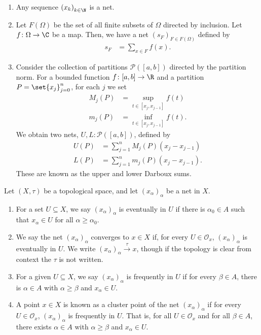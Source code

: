 \begin{example}
\begin{enumerate}[(1)]
  \item Any sequence $\left(x_k\right)_{k\in \N}$ is a net.
  \item Let $F\left(\Omega\right)$ be the set of all finite subsets of $\Omega$ directed by inclusion. Let $f\colon \Omega\rightarrow \C$ be a map. Then, we have a net $\left(s_F\right)_{F\in F\left(\Omega\right)}$ defined by
    \begin{align*}
      s_F &= \sum_{x\in F}f\left(x\right).
    \end{align*}
  \item Consider the collection of partitions $\mathcal{P}\left([a,b]\right)$ directed by the partition norm. For a bounded function $f\colon [a,b]\rightarrow \R$ and a partition $P = \set{x_j}_{j=0}^{n}$, for each $j$ we set
    \begin{align*}
      M_j\left(P\right) &= \sup_{t\in \left[x_j,x_{j-1}\right]}f(t)\\
      m_j\left(P\right) &= \inf_{t\in \left[x_j,x_{j-1}\right]}f(t).
    \end{align*}
    We obtain two nets, $U,L\colon \mathcal{P}\left([a,b]\right)$, defined by
    \begin{align*}
      U\left(P\right) &= \sum_{j=1}^{n}M_j\left(P\right)\left(x_j - x_{j-1}\right)\\
      L\left(P\right) &= \sum_{j=1}^{n}m_j\left(P\right)\left(x_j-x_{j-1}\right).
    \end{align*}
    These are known as the upper and lower Darboux sums.
\end{enumerate}
\end{example}
\begin{definition}
  Let $\left(X,\tau\right)$ be a topological space, and let $\left(x_{\alpha}\right)_{\alpha}$ be a net in $X$.
  \begin{enumerate}[(1)]
    \item For a set $U\subseteq X$, we say $\left(x_{\alpha}\right)_{\alpha}$ is eventually in $U$ if there is $\alpha_0\in A$ such that $x_{\alpha}\in U$ for all $\alpha \geq \alpha_0$.
    \item We say the net $\left(x_{\alpha}\right)_{\alpha}$ converges to $x\in X$ if, for every $U\in \mathcal{O}_{x}$, $\left(x_{\alpha}\right)_{\alpha}$ is eventually in $U$. We write $\left(x_{\alpha}\right)_{\alpha}\xrightarrow{\tau}x$, though if the topology is clear from context the $\tau$ is not written.
    \item For a given $U\subseteq X$, we say $\left(x_{\alpha}\right)_{\alpha}$ is frequently in $U$ if for every $\beta \in A$, there is $\alpha \in A$ with $\alpha \geq \beta$ and $x_{\alpha}\in U$.
    \item A point $x\in X$ is known as a cluster point of the net $\left(x_{\alpha}\right)_{\alpha}$ if for every $U\in \mathcal{O}_{x}$, $\left(x_{\alpha}\right)_{\alpha}$ is frequently in $U$. That is, for all $U\in \mathcal{O}_{x}$ and for all $\beta \in A$, there exists $\alpha \in A$ with $\alpha \geq \beta$ and $x_{\alpha}\in U$.
  \end{enumerate}
\end{definition}
